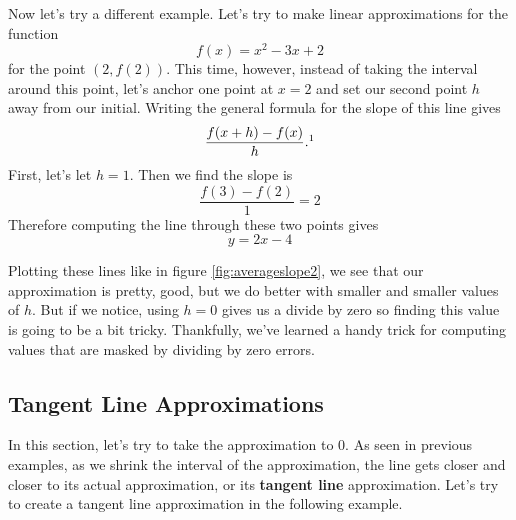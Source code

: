 \begin{ex}
	Now let's try a different example. Let's try to make linear approximations for the function
	$$f(x)=x^2-3x+2$$
	for the point $(2,f(2))$. This time, however, instead of taking the interval around this point, let's anchor one point at $x=2$ and set our second point $h$ away from our initial. Writing the general formula for the slope of this line gives
	$$\frac{f(x+h)-f(x)}{h}.\footnotemark$$
	First, let's let $h=1$. Then we find the slope is
	$$\frac{f(3)-f(2)}{1}=2$$
	Therefore computing the line through these two points gives
	$$y=2x-4$$
	\begin{figure}
	\centering
		\caption{}
		\label{fig:averageslope2}
	\end{figure}
	Plotting these lines like in figure \eqref{fig:averageslope2}, we see that our approximation is pretty, good, but we do better with smaller and smaller values of $h$. But if we notice, using $h=0$ gives us a divide by zero so finding this value is going to be a bit tricky. Thankfully, we've learned a handy trick for computing values that are masked by dividing by zero errors.
\end{ex}

\subsection{Tangent Line Approximations}
In this section, let's try to take the approximation to 0. As seen in previous examples, as we shrink the interval of the approximation, the line gets closer and closer to its actual approximation, or its \textbf{tangent line} approximation. Let's try to create a tangent line approximation in the following example.


